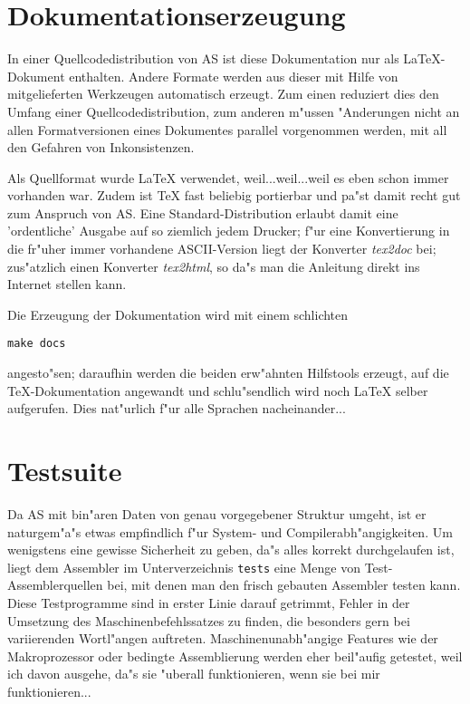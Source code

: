 \documentclass[12pt,a4paper,twoside]{report}
\begin{document}

\section{Dokumentationserzeugung}

In einer Quellcodedistribution von AS ist diese Dokumentation nur als
LaTeX-Dokument enthalten.  Andere Formate werden aus dieser mit Hilfe von
mitgelieferten Werkzeugen automatisch erzeugt.  Zum einen reduziert dies
den Umfang einer Quellcodedistribution, zum anderen m"ussen "Anderungen
nicht an allen Formatversionen eines Dokumentes parallel vorgenommen
werden, mit all den Gefahren von Inkonsistenzen.

Als Quellformat wurde LaTeX verwendet, weil...weil...weil es eben schon
immer vorhanden war.  Zudem ist TeX fast beliebig portierbar und pa"st
damit recht gut zum Anspruch von AS.  Eine Standard-Distribution erlaubt
damit eine 'ordentliche' Ausgabe auf so ziemlich jedem Drucker; f"ur eine
Konvertierung in die fr"uher immer vorhandene ASCII-Version liegt der
Konverter {\em tex2doc} bei; zus"atzlich einen Konverter {\em tex2html},
so da"s man die Anleitung direkt ins Internet stellen kann.

Die Erzeugung der Dokumentation wird mit einem schlichten
\begin{verbatim}
make docs
\end{verbatim}
angesto"sen; daraufhin werden die beiden erw"ahnten Hilfstools erzeugt,
auf die TeX-Dokumentation angewandt und schlu"sendlich wird noch LaTeX
selber aufgerufen.  Dies nat"urlich f"ur alle Sprachen nacheinander...


\section{Testsuite}

Da AS mit bin"aren Daten von genau vorgegebener Struktur umgeht, ist er
naturgem"a"s etwas empfindlich f"ur System- und Compilerabh"angigkeiten.
Um wenigstens eine gewisse Sicherheit zu geben, da"s alles korrekt
durchgelaufen ist, liegt dem Assembler im Unterverzeichnis {\tt tests}
eine Menge von Test-Assemblerquellen bei, mit denen man den frisch
gebauten Assembler testen kann.  Diese Testprogramme sind in erster Linie
darauf getrimmt, Fehler in der Umsetzung des Maschinenbefehlssatzes zu
finden, die besonders gern bei variierenden Wortl"angen auftreten.
Maschinenunabh"angige Features wie der Makroprozessor oder bedingte
Assemblierung werden eher beil"aufig getestet, weil ich davon ausgehe,
da"s sie "uberall funktionieren, wenn sie bei mir funktionieren...
\end{document}
